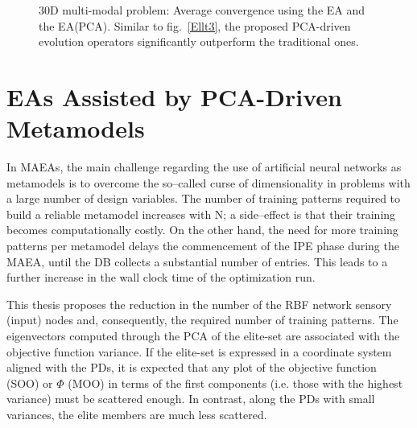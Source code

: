 \begin{figure}[h!]
\begin{minipage}[b]{1\linewidth}
 \centering
\end{minipage}
\caption{30D multi-modal problem: Average convergence using the EA and the EA(PCA). Similar to fig.\ \ref{Ellt3}, the proposed PCA-driven evolution operators significantly outperform the traditional ones.} 
\label{mmt3}
\end{figure}


\section{EAs Assisted by PCA-Driven Metamodels}
In MAEAs, the main challenge regarding the use of artificial neural networks as metamodels is to overcome the so--called curse of dimensionality in problems with a large number of design variables. 
The number of training patterns required to build a reliable metamodel increases with N; a side--effect is that their training becomes computationally costly. On the other hand, the need for more training patterns per metamodel delays the commencement of the IPE phase during the MAEA, until the DB collects a substantial number of entries. This leads to a further increase in the wall clock time of the optimization run.

This thesis proposes the reduction in the number of the RBF network sensory (input) nodes and, consequently, the required number of training patterns. The eigenvectors computed through the PCA of the elite-set are associated with the objective function variance. 
If the elite-set is expressed in a coordinate system aligned with the PDs, it is expected that any plot of the objective function (SOO) or $\Phi$ (MOO) in terms of the first components (i.e. those with the highest variance) must be scattered enough. In contrast, along the PDs with small variances, the elite members are much less scattered. 

